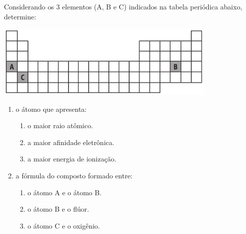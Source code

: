 Considerando os 3 elementos (A, B e C) indicados na tabela periódica abaixo, determine:

\begin{center}
	\includegraphics[width = 0.8\textwidth]{figure.png}
\end{center}

\begin{enumerate}[label = (\alph*)]
	\item o átomo que apresenta:
		\begin{enumerate}[label = (a.\roman*)]
			\item o maior raio atômico.
			\item a maior afinidade eletrônica.
			\item a maior energia de ionização.
		\end{enumerate}
	\item a fórmula do composto formado entre:
		\begin{enumerate}[label = (b.\roman*)]
			\item o átomo A e o átomo B.
			\item o átomo B e o flúor.
			\item o átomo C e o oxigênio.
		\end{enumerate}
\end{enumerate}
